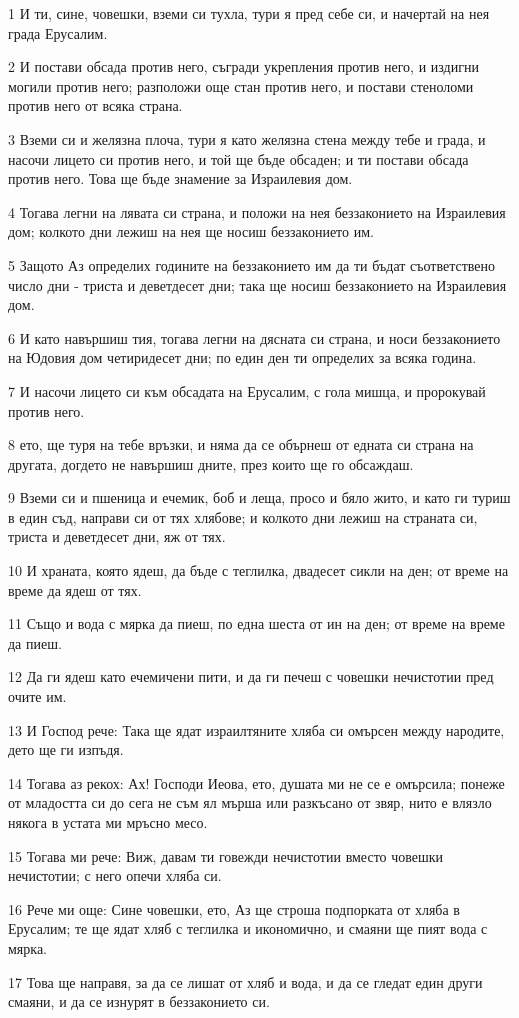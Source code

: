 \par 1 И ти, сине, човешки, вземи си тухла, тури я пред себе си, и начертай на нея града Ерусалим.
\par 2 И постави обсада против него, съгради укрепления против него, и издигни могили против него; разположи още стан против него, и постави стеноломи против него от всяка страна.
\par 3 Вземи си и желязна плоча, тури я като желязна стена между тебе и града, и насочи лицето си против него, и той ще бъде обсаден; и ти постави обсада против него. Това ще бъде знамение за Израилевия дом.
\par 4 Тогава легни на лявата си страна, и положи на нея беззаконието на Израилевия дом; колкото дни лежиш на нея ще носиш беззаконието им.
\par 5 Защото Аз определих годините на беззаконието им да ти бъдат съответствено число дни - триста и деветдесет дни; така ще носиш беззаконието на Израилевия дом.
\par 6 И като навършиш тия, тогава легни на дясната си страна, и носи беззаконието на Юдовия дом четиридесет дни; по един ден ти определих за всяка година.
\par 7 И насочи лицето си към обсадата на Ерусалим, с гола мишца, и пророкувай против него.
\par 8 ето, ще туря на тебе връзки, и няма да се обърнеш от едната си страна на другата, догдето не навършиш дните, през които ще го обсаждаш.
\par 9 Вземи си и пшеница и ечемик, боб и леща, просо и бяло жито, и като ги туриш в един съд, направи си от тях хлябове; и колкото дни лежиш на страната си, триста и деветдесет дни, яж от тях.
\par 10 И храната, която ядеш, да бъде с теглилка, двадесет сикли на ден; от време на време да ядеш от тях.
\par 11 Също и вода с мярка да пиеш, по една шеста от ин на ден; от време на време да пиеш.
\par 12 Да ги ядеш като ечемичени пити, и да ги печеш с човешки нечистотии пред очите им.
\par 13 И Господ рече: Така ще ядат израилтяните хляба си омърсен между народите, дето ще ги изпъдя.
\par 14 Тогава аз рекох: Ах! Господи Иеова, ето, душата ми не се е омърсила; понеже от младостта си до сега не съм ял мърша или разкъсано от звяр, нито е влязло някога в устата ми мръсно месо.
\par 15 Тогава ми рече: Виж, давам ти говежди нечистотии вместо човешки нечистотии; с него опечи хляба си.
\par 16 Рече ми още: Сине човешки, ето, Аз ще строша подпорката от хляба в Ерусалим; те ще ядат хляб с теглилка и икономично, и смаяни ще пият вода с мярка.
\par 17 Това ще направя, за да се лишат от хляб и вода, и да се гледат един други смаяни, и да се изнурят в беззаконието си.

